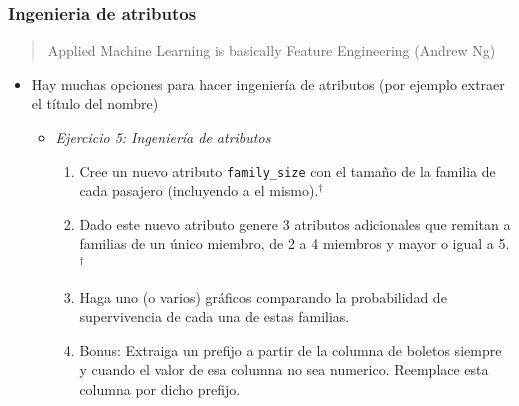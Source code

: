 \documentclass[leqno, 10pt, envcountsect]{beamer}
\numberwithin{equation}{section}
\theoremstyle{definition}
\theoremstyle{example}
\numberwithin{figure}{section}
\numberwithin{table}{section}
\let\olditem\item
\renewcommand{\item}{%
\olditem\vspace{1pt}}
\begin{document}
\begin{frame}[fragile=singleslide]
  \frametitle{Ingenieria de atributos}
  \begin{quote}
    Applied Machine Learning is basically Feature Engineering (Andrew Ng)
  \end{quote}

    \begin{itemize}
      \item Hay muchas opciones para hacer ingeniería de atributos (por ejemplo
        extraer el título del nombre)
      \begin{itemize}
        \item \textit{Ejercicio 5: Ingeniería de atributos}
          \begin{enumerate}
            \item Cree un nuevo atributo \texttt{family_size} con el tamaño de
              la familia de cada pasajero (incluyendo a el mismo).$^{\dag}$
                \item Dado este nuevo atributo genere 3 atributos adicionales
                  que remitan a familias de un único miembro, de 2 a 4 miembros
                  y mayor o igual a 5.$^{\dag}$
                \item Haga uno (o varios) gráficos comparando la probabilidad de
                  supervivencia de cada una de estas familias.
              \item Bonus: Extraiga un prefijo a partir de la columna de boletos
                siempre y cuando el valor de esa columna no sea numerico.
                Reemplace esta columna por dicho prefijo.
          \end{enumerate}
      \end{itemize}
    \end{itemize}
\end{frame}
\end{document}
